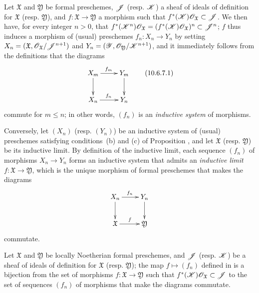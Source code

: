 \begin{env}[10.6.7]
\label{1.10.6.7}
Let $\mathfrak{X}$ and $\mathfrak{Y}$ be formal preschemes, $\mathscr{J}$ (resp. $\mathscr{K}$) a sheaf of ideals of definition for $\mathfrak{X}$ (resp. $\mathfrak{Y}$), and $f:\mathfrak{X}\to\mathfrak{Y}$ a morphism such that $f^*(\mathscr{K})\mathscr{O}_\mathfrak{X}\subset\mathscr{J}$.
We then have, for every integer $n>0$, that $f^*(\mathscr{K}^n)\mathscr{O}_\mathfrak{X}=(f^*(\mathscr{K})\mathscr{O}_\mathfrak{X})^n\subset\mathscr{J}^n$; $f$ thus induces  a morphism of (usual) preschemes $f_n:X_n\to Y_n$ by setting $X_n=(\mathfrak{X},\mathscr{O}_\mathfrak{X}/\mathscr{J}^{n+1})$ and $Y_n=(\mathscr{Y},\mathscr{O}_\mathfrak{Y}/\mathscr{K}^{n+1})$, and it immediately follows from the definitions that the diagrams
\[
\label{1.10.6.7.1}
  \xymatrix{
    X_m\ar[r]^{f_m}\ar[d] &
    Y_m\ar[d]\\
    X_n\ar[r]^{f_n} &
    Y_n
  }
  \tag{10.6.7.1}
\]
commute for $m\leq n$; in other words, $(f_n)$ is an \emph{inductive system} of morphisms.
\end{env}

\begin{env}[10.6.8]
\label{1.10.6.8}
Conversely, let $(X_n)$ (resp. $(Y_n)$) be an inductive system of (usual) preschemes satisfying conditions~(b) and (c) of Proposition , and let $\mathfrak{X}$ (resp. $\mathfrak{Y}$) be its inductive limit.
By definition of the inductive limit, each sequence $(f_n)$ of morphisms $X_n\to Y_n$ forms an inductive system that admits an \emph{inductive limit $f:\mathfrak{X}\to\mathfrak{Y}$}, which is the unique morphism of formal preschemes that makes the diagrams
\[
  \xymatrix{
    X_n\ar[r]^{f_n}\ar[d] &
    Y_n\ar[d]\\
    \mathfrak{X}\ar[r]^f &
    \mathfrak{Y}
  }
\]
commutate.
\end{env}

\begin{proposition}[10.6.9]
\label{1.10.6.9}
Let $\mathfrak{X}$ and $\mathfrak{Y}$ be locally Noetherian formal preschemes, and $\mathscr{J}$ (resp. $\mathscr{K}$) be a sheaf of ideals of definition for $\mathfrak{X}$ (resp. $\mathfrak{Y}$); the map $f\mapsto(f_n)$ defined in  is a bijection from the set of morphisms $f:\mathfrak{X}\to\mathfrak{Y}$ such that $f^*(\mathscr{K})\mathscr{O}_\mathfrak{X}\subset\mathscr{J}$ to the set of sequences $(f_n)$ of morphisms that make the diagrams  commutate.
\end{proposition}

